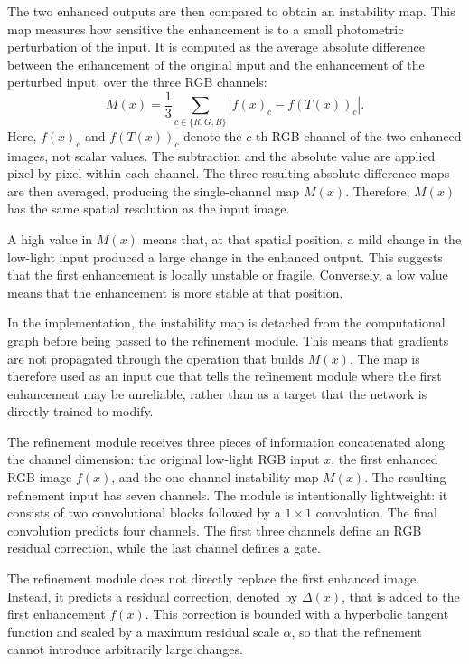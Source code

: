 The two enhanced outputs are then compared to obtain an instability map. This map measures how sensitive the enhancement is to a small photometric perturbation of the input. It is computed as the average absolute difference between the enhancement of the original input and the enhancement of the perturbed input, over the three RGB channels:
\begin{equation}
	M(x)
	=
	\frac{1}{3}
	\sum_{c \in \{R,G,B\}}
	\left|
	f(x)_c - f(T(x))_c
	\right|.
	\label{eq:ecl_far_instability_map}
\end{equation}
Here, $f(x)_c$ and $f(T(x))_c$ denote the $c$-th RGB channel of the two enhanced images, not scalar values. The subtraction and the absolute value are applied pixel by pixel within each channel. The three resulting absolute-difference maps are then averaged, producing the single-channel map $M(x)$. Therefore, $M(x)$ has the same spatial resolution as the input image.

A high value in $M(x)$ means that, at that spatial position, a mild change in the low-light input produced a large change in the enhanced output. This suggests that the first enhancement is locally unstable or fragile. Conversely, a low value means that the enhancement is more stable at that position.

In the implementation, the instability map is detached from the computational graph before being passed to the refinement module. This means that gradients are not propagated through the operation that builds $M(x)$. The map is therefore used as an input cue that tells the refinement module where the first enhancement may be unreliable, rather than as a target that the network is directly trained to modify.

The refinement module receives three pieces of information concatenated along the channel dimension: the original low-light RGB input $x$, the first enhanced RGB image $f(x)$, and the one-channel instability map $M(x)$. The resulting refinement input has seven channels. The module is intentionally lightweight: it consists of two convolutional blocks followed by a $1 \times 1$ convolution. The final convolution predicts four channels. The first three channels define an RGB residual correction, while the last channel defines a gate.

The refinement module does not directly replace the first enhanced image. Instead, it predicts a residual correction, denoted by $\Delta(x)$, that is added to the first enhancement $f(x)$. This correction is bounded with a hyperbolic tangent function and scaled by a maximum residual scale $\alpha$, so that the refinement cannot introduce arbitrarily large changes.


